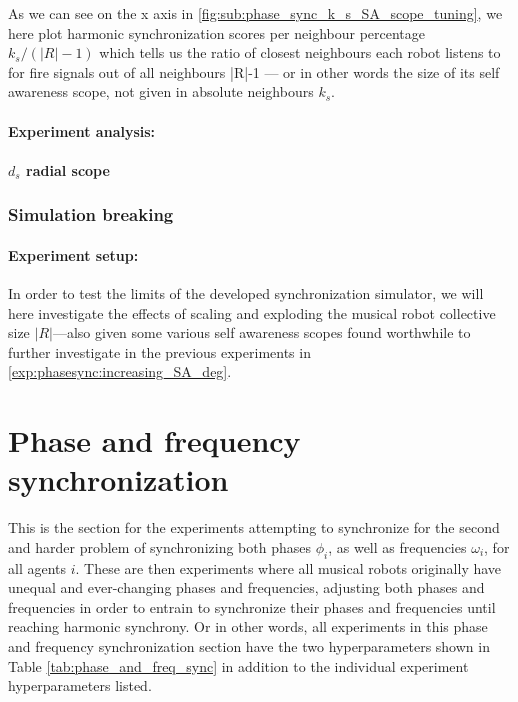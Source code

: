 				As we can see on the x axis in \ref{fig:sub:phase_sync_k_s_SA_scope_tuning}, we here plot harmonic synchronization scores per neighbour percentage $k_s/(|R|-1)$ which tells us the ratio of closest neighbours each robot listens to for fire signals out of all neighbours |R|-1 — or in other words the size of its self awareness scope, not given in absolute neighbours $k_s$.
		
				\paragraph{Experiment analysis:\nl}
				 
				 
			\paragraph{$d_s$ radial scope\nl}
	
	
		\subsubsection{Simulation breaking}
		
			\paragraph{Experiment setup:\nl}
			
			In order to test the limits of the developed synchronization simulator, we will here investigate the effects of scaling and exploding the musical robot collective size $|R|$—also given some various self awareness scopes found worthwhile to further investigate in the previous experiments in \ref{exp:phasesync:increasing_SA_deg}.
	



\section{Phase and frequency synchronization}
\label{sec:phase_and_freq_sync_experiments}
This is the section for the experiments attempting to synchronize for the second and harder problem of synchronizing both phases $\phi_i$, as well as frequencies $\omega_i$, for all agents $i$. These are then experiments where all musical robots originally have unequal and ever-changing phases  and frequencies, adjusting both phases and frequencies in order to entrain to synchronize their phases and frequencies until reaching harmonic synchrony. Or in other words, all experiments in this phase and frequency synchronization section have the two hyperparameters shown in Table \ref{tab:phase_and_freq_sync} in addition to the individual experiment hyperparameters listed.

